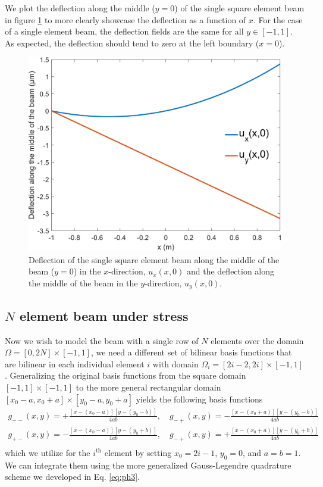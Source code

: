 \documentclass[11pt]{article}
\begin{document}
We plot the deflection along the middle ($y=0$) of the single square element beam in figure \ref{fig:q2a_plot} to more clearly showcase the deflection as a function of $x$. For the case of a single element beam, the deflection fields are the same for all $y \in [-1,1]$. As expected, the deflection should tend to zero at the left boundary ($x=0$).

\begin{figure}[!htb]
	\centering
	\includegraphics[width=0.7\linewidth]{q2a_plot.png}
	\caption{Deflection of the single square element beam along the middle of the beam ($y=0$) in the $x$-direction, $u_x(x,0)$ and the deflection along the middle of the beam in the $y$-direction, $u_y(x,0)$.}
	\label{fig:q2a_plot}
\end{figure}

\subsection{$N$ element beam under stress}
Now we wish to model the beam with a single row of $N$ elements over the domain $\Omega = [0,2N]\times[-1,1]$, we need a different set of bilinear basis functions that are bilinear in each individual element $i$ with domain $\Omega_i = [2i-2, 2i]\times[-1,1]$. Generalizing the original basis functions from the square domain $[-1,1]\times[-1,1]$ to the more general rectangular domain $[x_0-a,x_0+a]\times[y_0-a,y_0+a]$ yields the following basis functions
\begin{equation} \label{eq:genBasis}
\begin{gathered}
	g_{--}(x,y) = +\frac{[x-(x_0-a)][y-(y_0-b)]}{4ab}, \quad g_{-+}(x,y) = -\frac{[x-(x_0+a)][y-(y_0-b)]}{4ab} \\
	g_{+-}(x,y) = -\frac{[x-(x_0-a)][y-(y_0+b)]}{4ab}, \quad g_{-+}(x,y) = +\frac{[x-(x_0+a)][y-(y_0+b)]}{4ab} \\
\end{gathered}
\end{equation}
which we utilize for the $i^\mathrm{th}$ element by setting $x_0=2i-1$, $y_0=0$, and $a=b=1$. We can integrate them using the more generalized Gauss-Legendre quadrature scheme we developed in Eq. \eqref{eq:ph3}.
\end{document}
